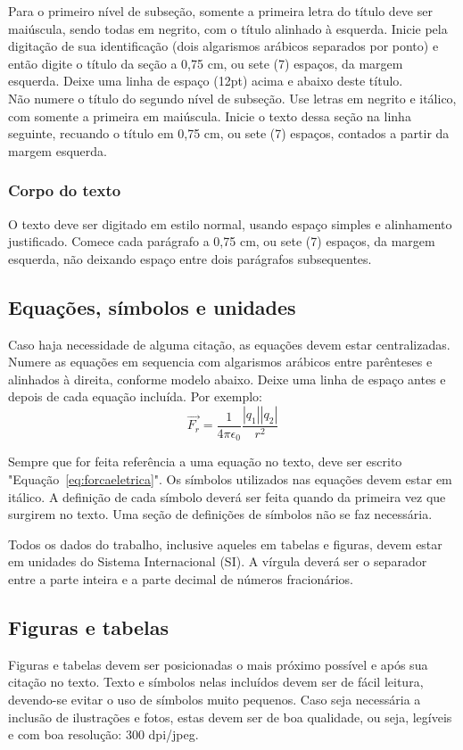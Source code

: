 \documentclass[12pt,a4paper]{article}
\begin{document}
Para o primeiro nível de subseção, somente a primeira letra do título deve ser maiúscula, sendo todas em negrito, com o título alinhado à esquerda. Inicie pela digitação de sua identificação (dois algarismos arábicos separados por ponto) e então digite o título da seção a 0,75 cm, ou sete (7) espaços, da margem esquerda. Deixe uma linha de espaço (12pt) acima e abaixo deste título.\\
Não numere o título do segundo nível de subseção. Use letras em negrito e itálico, com somente a primeira em maiúscula. Inicie o texto dessa seção na linha seguinte, recuando o título em 0,75 cm, ou sete (7) espaços, contados a partir da margem esquerda.

\subsubsection{Corpo do texto}
O texto deve ser digitado em estilo normal, usando espaço simples e alinhamento justificado. Comece cada parágrafo a 0,75 cm, ou sete (7) espaços, da margem esquerda, não deixando espaço entre dois parágrafos subsequentes.

\subsection{Equações, símbolos e unidades}
Caso haja necessidade de alguma citação, as equações devem estar centralizadas. Numere as equações em sequencia com algarismos arábicos entre parênteses e alinhados à direita, conforme modelo abaixo. Deixe uma linha de espaço antes e depois de cada equação incluída. Por exemplo:
\begin{equation}
\vec{F_{r}} =\dfrac{1}{4\pi\epsilon_0}\dfrac{|q_1||q_2|}{r^2} \label{eq:forcaeletrica}
\end{equation}

Sempre que for feita referência a uma equação no texto, deve ser escrito "Equação~\eqref{eq:forcaeletrica}". Os símbolos utilizados nas equações devem estar em itálico. A definição de cada símbolo deverá ser feita quando da primeira vez que surgirem no texto. Uma seção de definições de símbolos não se faz necessária.

Todos os dados do trabalho, inclusive aqueles em tabelas e figuras, devem estar em unidades do Sistema Internacional (SI). A vírgula deverá ser o separador entre a parte inteira e a parte decimal de números fracionários.

\subsection{Figuras e tabelas}
Figuras e tabelas devem ser posicionadas o mais próximo possível e após sua citação no texto. Texto e símbolos nelas incluídos devem ser de fácil leitura, devendo-se evitar o uso de símbolos muito pequenos. Caso seja necessária a inclusão de ilustrações e fotos, estas devem ser de boa qualidade, ou seja, legíveis e com boa resolução: 300 dpi/jpeg.
\end{document}
